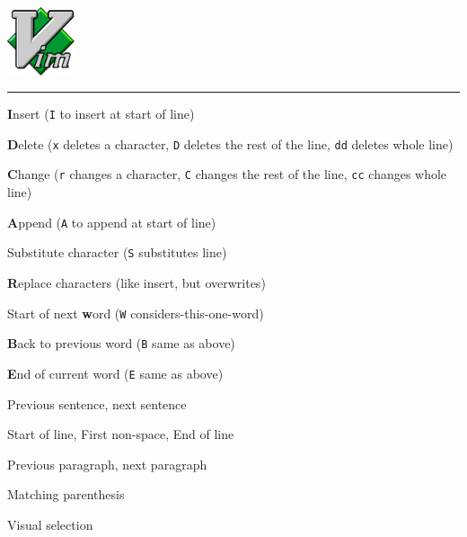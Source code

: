 \documentclass[12pt, a4paper]
{article}
\begin{document}
\pagestyle{empty}

\begin{center}
	 \hspace{1em}  \includegraphics[height=2cm]{Vim_logo}
	\vspace*{0.5em}
	\hrule
\end{center}

\begin{multicols}{3}
	
\begin{description}[nolistsep]
	\item[i] \textbf{I}nsert (\texttt{I} to insert at start of line)
	\item[d] \textbf{D}elete (\texttt{x} deletes a character, \texttt{D} deletes the rest of the line, \texttt{dd} deletes whole line)
	\item[c] \textbf{C}hange (\texttt{r} changes a character, \texttt{C} changes the rest of the line, \texttt{cc} changes whole line)
	\item[a] \textbf{A}ppend (\texttt{A} to append at start of line)
	\item[s] Substitute character (\texttt{S} substitutes line)
	\item[R] \textbf{R}eplace characters (like insert, but overwrites)
\end{description}


\begin{description}[nolistsep]
	\item[w] Start of next \textbf{w}ord (\texttt{W} considers-this-one-word)
	\item[b] \textbf{B}ack to previous word (\texttt{B} same as above)
	\item[e] \textbf{E}nd of current word (\texttt{E} same as above)
	\item[( )] Previous sentence, next sentence
	\item[0 \textasciicircum \ \$] Start of line, First non-space, End of line
	\item[\{ \}] Previous paragraph, next paragraph
	\item[\%] Matching parenthesis
	\item[v] Visual selection
\end{description}


\end{multicols}
\end{document}
